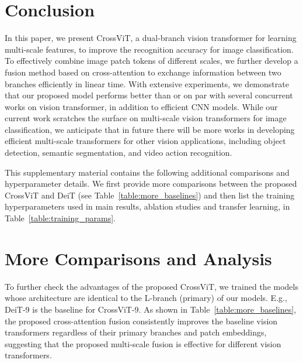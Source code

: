 \documentclass[10pt,twocolumn,letterpaper]{article}
\def\ours{CrossViT\xspace}
\newcommand{\myparagraphfirst}[1]{\vspace{0mm} \noindent {\textbf{#1}}}
\begin{document}
%
 \section{Conclusion}
\label{sec:conclusion}
In this paper, we present \ours, a dual-branch vision transformer for learning multi-scale features, to improve the recognition accuracy for image classification. To effectively combine image patch tokens of different scales, we further develop a fusion method based on cross-attention to exchange information between two branches efficiently in linear time.
With extensive experiments, we demonstrate that our proposed model performs better than or on par with several concurrent works on vision transformer, in addition to efficient CNN models.
While our current work scratches the surface on multi-scale vision transformers for image classification, we anticipate that in future there will be more works in developing efficient multi-scale transformers for other vision applications, including object detection, semantic segmentation, and video action recognition.


 

{\small


}

\clearpage

\appendix
\myparagraphfirst{Summary} This supplementary material contains the following additional comparisons and hyperparameter details.
We first provide more comparisons between the proposed \ours and DeiT (see Table~\ref{table:more_baselines}) and then list the training hyperparameters used in main results, ablation studies and transfer learning, in Table~\ref{table:training_params}. 


\section{More Comparisons and Analysis}



To further check the advantages of the proposed \ours, we trained the models whose architecture are identical to the L-branch (primary) of our models. E.g., DeiT-9 is the baseline for \ours-9. As shown in Table~\ref{table:more_baselines},
the proposed cross-attention fusion consistently improves the baseline vision transformers regardless of their primary branches and patch embeddings, suggesting that the proposed multi-scale fusion is effective for different vision transformers. 
\end{document}
